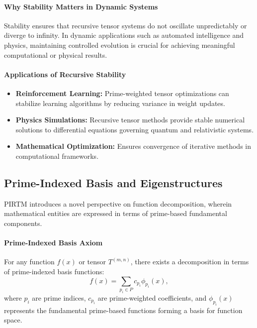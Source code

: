 \documentclass{article}
\theoremstyle{plain}
\begin{document}
\paragraph{Why Stability Matters in Dynamic Systems}
Stability ensures that recursive tensor systems do not oscillate unpredictably or diverge to infinity. In dynamic applications such as automated intelligence and physics, maintaining controlled evolution is crucial for achieving meaningful computational or physical results.

\paragraph{Applications of Recursive Stability}
\begin{itemize}
    \item \textbf{Reinforcement Learning:} Prime-weighted tensor optimizations can stabilize learning algorithms by reducing variance in weight updates.
    \item \textbf{Physics Simulations:} Recursive tensor methods provide stable numerical solutions to differential equations governing quantum and relativistic systems.
    \item \textbf{Mathematical Optimization:} Ensures convergence of iterative methods in computational frameworks.
\end{itemize}

\subsection{Prime-Indexed Basis and Eigenstructures}

PIRTM introduces a novel perspective on function decomposition, wherein mathematical entities are expressed in terms of prime-based fundamental components.

\paragraph{Prime-Indexed Basis Axiom}
For any function \( f(x) \) or tensor \( T^{(m,n)} \), there exists a decomposition in terms of prime-indexed basis functions:
\begin{equation}
    f(x) = \sum_{p_i \in P} c_{p_i} \phi_{p_i}(x),
\end{equation}
where \( p_i \) are prime indices, \( c_{p_i} \) are prime-weighted coefficients, and \( \phi_{p_i}(x) \) represents the fundamental prime-based functions forming a basis for function space.
\end{document}
